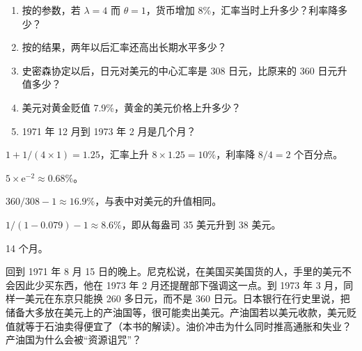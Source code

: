 \begin{selfcheck}
\begin{enumerate}
\item 按的参数，若 $\lambda=4$ 而 $\theta=1$，货币增加 8\%，汇率当时上升多少？利率降多少？
\item 按的结果，两年以后汇率还高出长期水平多少？
\item 史密森协定以后，日元对美元的中心汇率是 308 日元，比原来的 360 日元升值多少？
\item 美元对黄金贬值 7.9\%，黄金的美元价格上升多少？
\item 1971 年 12 月到 1973 年 2 月是几个月？
\end{enumerate}
\end{selfcheck}

\begin{answers}
\item $1+1/(4\times1)=1.25$，汇率上升 $8\times1.25=10\%$，利率降 $8/4=2$ 个百分点。
\item $5\times\mathrm{e}^{-2}\approx0.68\%$。
\item $360/308-1\approx16.9\%$，与表中对美元的升值相同。
\item $1/(1-0.079)-1\approx8.6\%$，即从每盎司 35 美元升到 38 美元。
\item 14 个月。
\end{answers}

回到 1971 年 8 月 15 日的晚上。尼克松说，在美国买美国货的人，手里的美元不会因此少买东西，他在 1973 年 2 月还提醒部下强调这一点\cite{nixon1971,frus46b}。到 1973 年 3 月，同样一美元在东京只能换 260 多日元，而不是 360 日元\cite{bisdata46}。日本银行在行史里说，把储备大多放在美元上的产油国等，很可能卖出美元\cite{boj1986}。产油国若以美元收款，美元贬值就等于石油卖得便宜了（本书的解读）。油价冲击为什么同时推高通胀和失业？产油国为什么会被“资源诅咒”？
